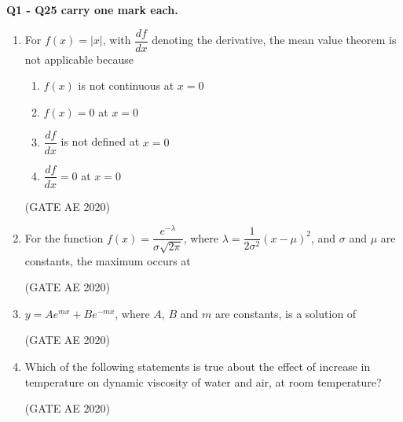 \documentclass[journal,12pt,onecolumn]{IEEEtran}
\theoremstyle{remark}
\begin{document}
\textbf{Q1 - Q25 carry one mark each.}
\begin{enumerate}
   
\item For $f(x) = |x|$, with $\dfrac{df}{dx}$ denoting the derivative, the mean value theorem is not applicable because
\begin{multicols}{2}
\begin{enumerate}
    \item $f(x)$ is not continuous at $x=0$
    \item $f(x) = 0$ at $x = 0$
    \item $\dfrac{df}{dx}$ is not defined at $x = 0$
    \item $\dfrac{df}{dx} = 0$ at $x = 0$
\end{enumerate}
\end{multicols}
\hfill(GATE AE 2020)

\item For the function $f(x) = \dfrac{e^{-\lambda}}{\sigma \sqrt{2\pi}}$, where 
$\lambda = \dfrac{1}{2\sigma^2}(x-\mu)^2$, and $\sigma$ and $\mu$ are constants, the maximum occurs at
\begin{enumerate}
\end{enumerate}
\hfill(GATE AE 2020)


\item $y = Ae^{mx} + Be^{-mx}$, where $A$, $B$ and $m$ are constants, is a solution of
\begin{enumerate}
\end{enumerate}
\hfill(GATE AE 2020)

\item Which of the following statements is true about the effect of increase in temperature on dynamic viscosity of water and air, at room temperature?
\begin{enumerate}
\end{enumerate}
\hfill(GATE AE 2020)


\end{enumerate}
\end{document}
